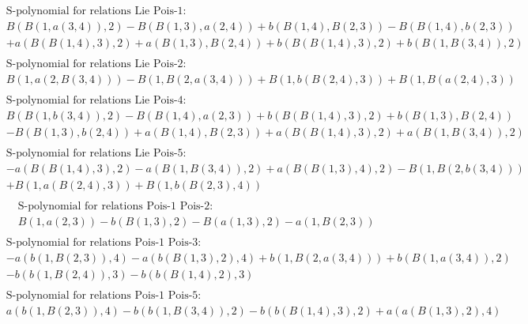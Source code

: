 \documentclass[11pt]{amsart}
\begin{document}
\begin{align*}
\end{align*}\begin{align*} 
& \text{S-polynomial for relations Lie Pois-1:} \\ 
&B(B(1,a(3,4)),2) - B(B(1,3),a(2,4)) + b(B(1,4),B(2,3)) - B(B(1,4),b(2,3))\\ 
 &  + a(B(B(1,4),3),2) + a(B(1,3),B(2,4)) + b(B(B(1,4),3),2) + b(B(1,B(3,4)),2) \\ 
\end{align*}\begin{align*} 
& \text{S-polynomial for relations Lie Pois-2:} \\ 
&B(1,a(2,B(3,4))) - B(1,B(2,a(3,4))) + B(1,b(B(2,4),3)) + B(1,B(a(2,4),3)) \\ 
\end{align*}\begin{align*} 
& \text{S-polynomial for relations Lie Pois-4:} \\ 
&B(B(1,b(3,4)),2) - B(B(1,4),a(2,3)) + b(B(B(1,4),3),2) + b(B(1,3),B(2,4))\\ 
 &  - B(B(1,3),b(2,4)) + a(B(1,4),B(2,3)) + a(B(B(1,4),3),2) + a(B(1,B(3,4)),2) \\ 
\end{align*}\begin{align*} 
& \text{S-polynomial for relations Lie Pois-5:} \\ 
& - a(B(B(1,4),3),2) - a(B(1,B(3,4)),2) + a(B(B(1,3),4),2) - B(1,B(2,b(3,4)))\\ 
 &  + B(1,a(B(2,4),3)) + B(1,b(B(2,3),4)) \\ 
\end{align*}\begin{align*} 
& \text{S-polynomial for relations Pois-1 Pois-2:} \\ 
&B(1,a(2,3)) - b(B(1,3),2) - B(a(1,3),2) - a(1,B(2,3)) \\ 
\end{align*}\begin{align*} 
& \text{S-polynomial for relations Pois-1 Pois-3:} \\ 
& - a(b(1,B(2,3)),4) - a(b(B(1,3),2),4) + b(1,B(2,a(3,4))) + b(B(1,a(3,4)),2)\\ 
 &  - b(b(1,B(2,4)),3) - b(b(B(1,4),2),3) \\ 
\end{align*}\begin{align*} 
& \text{S-polynomial for relations Pois-1 Pois-5:} \\ 
&a(b(1,B(2,3)),4) - b(b(1,B(3,4)),2) - b(b(B(1,4),3),2) + a(a(B(1,3),2),4)\\ 

\end{align*}
\end{document}
